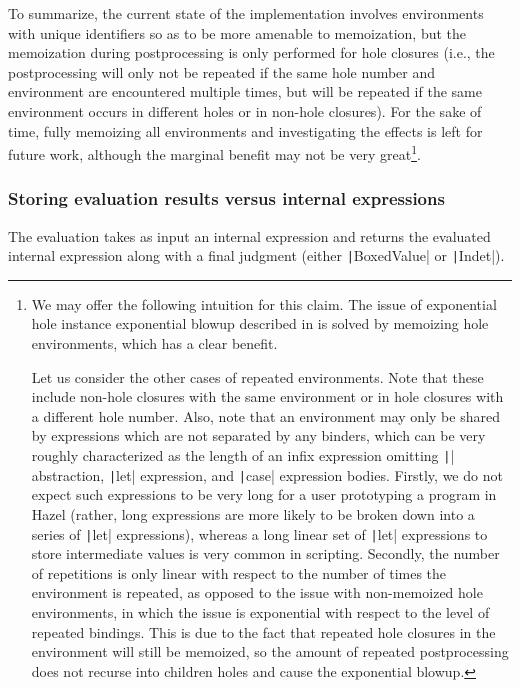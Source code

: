 To summarize, the current state of the implementation involves environments with unique identifiers so as to be more amenable to memoization, but the memoization during postprocessing is only performed for hole closures (i.e., the postprocessing will only not be repeated if the same hole number and environment are encountered multiple times, but will be repeated if the same environment occurs in different holes or in non-hole closures). For the sake of time, fully memoizing all environments and investigating the effects is left for future work, although the marginal benefit may not be very great\footnote{
  We may offer the following intuition for this claim. The issue of exponential hole instance exponential blowup described in  is solved by memoizing hole environments, which has a clear benefit.

  Let us consider the other cases of repeated environments. Note that these include non-hole closures with the same environment or in hole closures with a different hole number. Also, note that an environment may only be shared by expressions which are not separated by any binders, which can be very roughly characterized as the length of an infix expression omitting \texttt|\lambda| abstraction, \texttt|let| expression, and \texttt|case| expression bodies. Firstly, we do not expect such expressions to be very long for a user prototyping a program in Hazel (rather, long expressions are more likely to be broken down into a series of \texttt|let| expressions), whereas a long linear set of \texttt|let| expressions to store intermediate values is very common in scripting. Secondly, the number of repetitions is only linear with respect to the number of times the environment is repeated, as opposed to the issue with non-memoized hole environments, in which the issue is exponential with respect to the level of repeated bindings. This is due to the fact that repeated hole closures in the environment will still be memoized, so the amount of repeated postprocessing does not recurse into children holes and cause the exponential blowup.
}.

\subsubsection{Storing evaluation results versus internal expressions}
\label{sec:result-vs-dhexp}

The evaluation takes as input an internal expression and returns the evaluated internal expression along with a \textsf{final} judgment (either \texttt|BoxedValue| or \texttt|Indet|).

